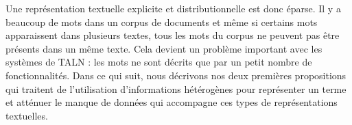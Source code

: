 \documentclass[a4paper,11pt,twoside]{article}
\begin{document}
Une représentation textuelle explicite et distributionnelle est donc éparse. Il y a beaucoup de mots dans un corpus de documents et même si certains mots apparaissent dans plusieurs textes, tous les mots du corpus ne peuvent pas être présents dans un même texte. Cela devient un problème important avec les systèmes de TALN : les mots ne sont décrits que par un petit nombre de fonctionnalités. Dans ce qui suit, nous décrivons nos deux premières propositions qui traitent de l'utilisation d'informations hétérogènes pour représenter un terme et atténuer le manque de données qui accompagne ces types de représentations textuelles.

%
%
\end{document}
